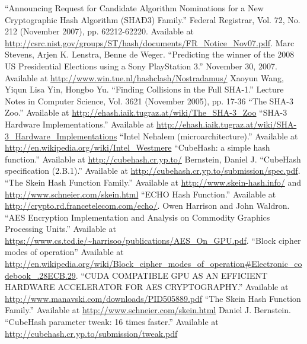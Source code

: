 \documentclass{article}
\begin{document}
\begin{thebibliography}{9}
   ``Announcing Request for Candidate Algorithm Nominations for a New Cryptographic Hash Algorithm (SHAÐ3) Family.'' Federal Registrar, Vol. 72, No. 212 (November 2007), pp. 62212-62220. Available at \url{http://csrc.nist.gov/groups/ST/hash/documents/FR_Notice_Nov07.pdf}.
   Marc Stevens, Arjen K. Lenstra, Benne de Weger. ``Predicting the winner of the 2008 US Presidential Elections using a Sony PlayStation 3.'' November 30, 2007. Available at \url{http://www.win.tue.nl/hashclash/Nostradamus/}
   Xaoyun Wang, Yiqun Lisa Yin, Hongbo Yu. ``Finding Collisions in the Full SHA-1.'' Lecture Notes in Computer Science, Vol. 3621 (November 2005), pp. 17-36
   ``The SHA-3 Zoo.'' Available at \url{http://ehash.iaik.tugraz.at/wiki/The_SHA-3_Zoo}
   ``SHA-3 Hardware Implementations.'' Available at \url{http://ehash.iaik.tugraz.at/wiki/SHA-3_Hardware_Implementations}
   ``Intel Nehalem (microarchitecture).'' Available at \url{http://en.wikipedia.org/wiki/Intel_Westmere}
   ``CubeHash: a simple hash function.'' Available at \url{http://cubehash.cr.yp.to/}
   Bernstein, Daniel J. ``CubeHash specification (2.B.1).'' Available at \url{http://cubehash.cr.yp.to/submission/spec.pdf}.
   ``The Skein Hash Function Family.'' Available at \url{http://www.skein-hash.info/} and \url{http://www.schneier.com/skein.html}
   ``ECHO Hash Function.'' Available at \url{http://crypto.rd.francetelecom.com/echo/}.
   Owen Harrison and John Waldron. ``AES Encryption Implementation and Analysis on Commodity Graphics Processing Units.'' Available at \url{https://www.cs.tcd.ie/~harrisoo/publications/AES_On_GPU.pdf}.
   ``Block cipher modes of operation'' Available at \url{http://en.wikipedia.org/wiki/Block_cipher_modes_of_operation#Electronic_codebook_.28ECB.29}.
   ``CUDA COMPATIBLE GPU AS AN EFFICIENT HARDWARE ACCELERATOR FOR AES CRYPTOGRAPHY.'' Available at \url{http://www.manavski.com/downloads/PID505889.pdf}
   ``The Skein Hash Function Family.'' Available at \url{http://www.schneier.com/skein.html}
   Daniel J. Bernstein. ``CubeHash parameter tweak: 16 times faster.'' Available at \url{http://cubehash.cr.yp.to/submission/tweak.pdf}
\end{thebibliography}
\end{document}
